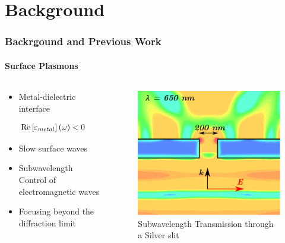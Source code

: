 \documentclass[mathserif,18pt,xcolor=table]{beamer}
\begin{document}
\section{Background}
\begin{frame}
  \frametitle{Backrgound and Previous Work}
  \framesubtitle{Surface Plasmons}

  \begin{columns} %
    \begin{column}{.5\textwidth}
      \begin{minipage}[T][.1\textheight][c]{\linewidth}
        \begin{itemize}
          \item Metal-dielectric interface
        \end{itemize}
          \begin{equation} \nonumber
            \mathrm{Re} \left[\varepsilon_{metal}\right](\omega) < 0
          \end{equation}
          \begin{itemize}
            \item Slow surface waves
            \item Subwavelength Control of electromagnetic waves
            \item Focusing beyond the diffraction limit
          \end{itemize}
      \end{minipage}
    \end{column}
    \begin{column}{.5\textwidth}
      \begin{figure}
        \includegraphics[scale=.3]{E_squared_final.png}
        \caption{Subwavelength Transmission through a Silver slit}
      \end{figure}
      \end{column}%
    \end{columns}
\end{frame}
\end{document}
